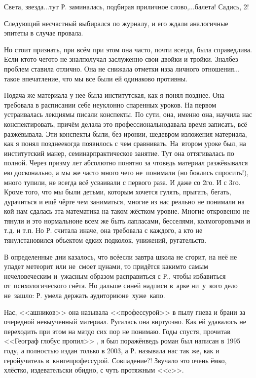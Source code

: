 \diagdash Света, звезда$\ldots$\mdash тут Р. заминалась, подбирая приличное слово,\mdash $\ldots$балета! Садись, 2!

Следующий несчастный выбирался по журналу, и его ждали аналогичные эпитеты в случае провала.	

Но стоит признать, при всём при этом она часто, почти всегда, была справедлива. Если кто\sdash то чего\sdash то не знал\mdash получал заслуженно свои двойки и тройки. Знал\mdash без проблем ставила отлично. Она не снижала отметки из\sdash за личного отношения$\ldots$ такое впечатление, что мы все были ей одинаково противны. 

Подача же материала у нее была институтская, как я понял позднее. Она требовала в расписании себе неуклонно спаренных уроков. На первом устраивалась лекция\mdash мы писали конспекты. По сути, она, именно она, научила нас конспектировать, причём делала это профессионально\mdash давала время записать, всё разжёвывала. Эти конспекты были, без иронии, шедевром изложения материала, как я понял позднее\mdash когда появилось с чем сравнивать. На~втором уроке был, на институтский манер, семинар\mdash практическое занятие. Тут она оттягивалась по полной. Через призму лет абсолютно понятно за что\mdash ведь материал разжёвывался ею досконально, а мы же часто много чего не~понимали (но боялись спросить!), много тупили, не всегда всё усваивали с  первого раза. И даже со 2\sdash го. И с 3\sdash го. Кроме того, что мы были детьми, которым хочется гулять, прыгать, бегать, дурачиться и ещё чёрте чем заниматься, многие из нас реально не понимали на кой нам сдалась эта математика на таком жёстком уровне. Многие откровенно не тянули и это нормально\mdash не всем же быть лапласами, бесселями, колмогоровыми и т.д. и т.п. Но Р. считала иначе, она требовала с каждого, а кто не тянул\mdash становился объектом едких подколок, унижений, ругательств.

В определенные дни казалось, что всё\mdash если завтра школа не сгорит, на неё не упадет метеорит или не~смоет цунами, то придётся каким\sdash то самым нечеловеческим и~ужасным образом расправиться с Р., чтобы избавиться от~психологического гнёта. Но дальше синей надписи в~арке ни~у~кого дело не~зашло: Р. умела держать аудиторию\mdash не~хуже~капо.

Нас, <<ашников>> она называла <<профессурой>> в пылу гнева и брани за очередной невыученный материал. Ругалась она виртуозно. Как ей удавалось не переходить при этом на мат\mdash до сих пор не понимаю. Годы спустя, прочитав <<Географ глобус пропил>> \cite{ГеографГлобусПропил}, я был поражён\mdash ведь роман был написан в 1995 году, а полностью издан только в 2003, а Р. называла нас так же, как и герой\sdash учитель в~книге\mdash профессурой. Совпадение?! Звучало это очень ёмко, хлёстко, издевательски обидно, с чуть протяжным <<c>>.

